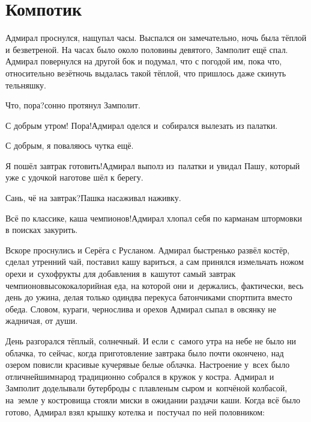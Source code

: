 \chapter{Компотик}
\vepsianrose

Адмирал проснулся, нащупал часы. Выспался он замечательно, ночь была тёплой и безветреной. На часах было около половины девятого, Замполит ещё спал. Адмирал повернулся на другой бок и подумал, что с погодой им, пока что, относительно везёт\mdash ночь выдалась такой тёплой, что пришлось даже скинуть тельняшку.

\diagdash Что, пора?\mdash сонно протянул Замполит.

\diagdash С добрым утром! Пора!\mdash Адмирал оделся и~собирался вылезать из палатки.

\diagdash С добрым, я поваляюсь чутка ещё.

\diagdash Я пошёл завтрак готовить!\mdash Адмирал выполз из~палатки и увидал Пашу, который уже с удочкой наготове шёл к берегу.

\diagdash Сань, чё на завтрак?\mdash Пашка насаживал наживку.

\diagdash Всё по классике, каша чемпионов!\mdash Адмирал хлопал себя по карманам штормовки в поисках закурить.

Вскоре проснулись и Серёга с Русланом. Адмирал быстренько развёл костёр, сделал утренний чай, поставил кашу вариться, а сам принялся измельчать ножом орехи и~сухофрукты для добавления в~кашу\mdash тот самый завтрак чемпионов\mdash высококалорийная еда, на которой они и~держались, фактически, весь день до ужина, делая только один\sdash два перекуса батончиками спортпита вместо обеда. Словом, кураги, чернослива и орехов Адмирал сыпал в овсянку не жадничая, от души.

День разгорался тёплый, солнечный. И если с~самого утра на небе не было ни облачка, то сейчас, когда приготовление завтрака было почти окончено, над озером повисли красивые кучерявые белые облачка. Настроение у~всех было отличнейшим\mdash народ традиционно собрался в кружок у костра. Адмирал и Замполит доделывали бутерброды с плавленым сыром и~копчёной колбасой, на~земле у костровища стояли миски в ожидании раздачи каши. Когда всё было готово, Адмирал взял крышку котелка и~постучал по ней половником:

